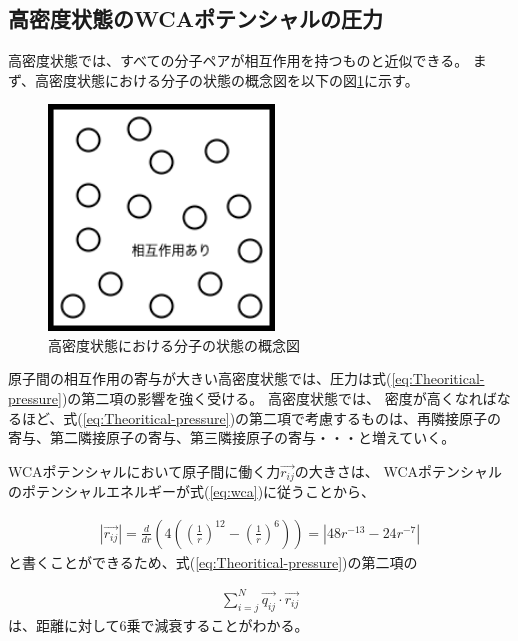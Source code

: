 \documentclass[titlepage]{jsreport}
\begin{document}
{{{\subsection{高密度状態のWCAポテンシャルの圧力}\label{results-subsec:WCA-press-high-density}
高密度状態では、すべての分子ペアが相互作用を持つものと近似できる。
まず、高密度状態における分子の状態の概念図を以下の図\ref{fig:highdensity.png}に示す。

\begin{figure}[htbp]
    \begin{center}
        \includegraphics[width=6cm]{fig/highdensity.png}
    \end{center}
    \caption{高密度状態における分子の状態の概念図}
    \label{fig:highdensity.png}
\end{figure}

原子間の相互作用の寄与が大きい高密度状態では、圧力は式(\ref{eq:Theoritical-pressure})の第二項の影響を強く受ける。
高密度状態では、
密度が高くなればなるほど、式(\ref{eq:Theoritical-pressure})の第二項で考慮するものは、再隣接原子の寄与、第二隣接原子の寄与、第三隣接原子の寄与・・・と増えていく。

WCAポテンシャルにおいて原子間に働く力$\vec{r_{ij}}$の大きさは、
WCAポテンシャルのポテンシャルエネルギーが式(\ref{eq:wca})に従うことから、

\large
\begin{eqnarray}
    | {\vec{r_{ij}}} |=\frac{d}{dr}\left(4\left(\left(\frac{1}{r}\right)^{12}-\left(\frac{1}{r}\right)^6\right)\right)=| 48r^{-13}-24r^{-7}| \nonumber
\end{eqnarray}
\normalsize
と書くことができるため、式(\ref{eq:Theoritical-pressure})の第二項の

\large
\begin{eqnarray}
    \sum_{i=j}^N\vec{q_{ij}} \cdot \vec{r_{ij}} \nonumber
\end{eqnarray}
\normalsize
は、距離に対して6乗で減衰することがわかる。

}}}
\end{document}

